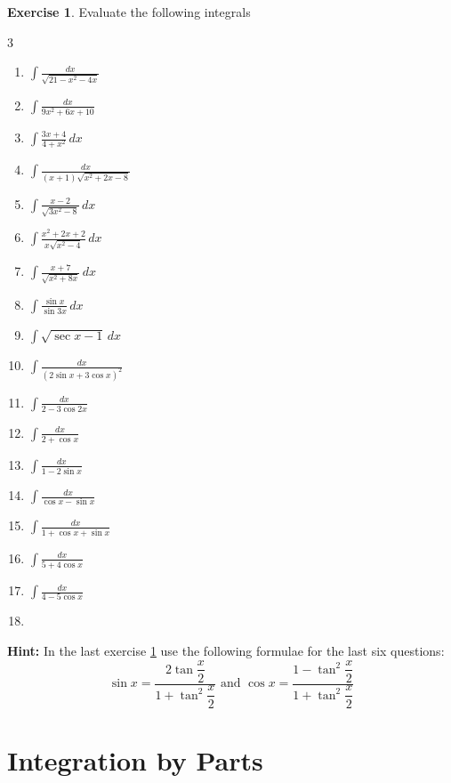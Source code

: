 \documentclass{book}
\theoremstyle{definition}
\newtheorem{exercise}{Exercise}[section]
\begin{document}
\begin{exercise}\label{ex:has_hints}
Evaluate the following integrals
\begin{multicols}{3}
\begin{enumerate}[label=(\roman*)]
    \item $\displaystyle\int \frac{dx}{\sqrt{21-x^2-4x}}$
    \item $\displaystyle\int\frac{dx}{9x^2+6x+10}$
    \item $\displaystyle\int \frac{3x+4}{4+x^2}\,dx$
    \item $\displaystyle\int \frac{dx}{(x+1)\sqrt{x^2+2x-8}}$
    \item $\displaystyle\int \frac{x-2}{\sqrt{3x^2-8}}\,dx$
    \item $\displaystyle\int \frac{x^2+2x+2}{x\sqrt{x^2-4}}\,dx$
    \item $\displaystyle\int \frac{x+7}{\sqrt{x^2+8x}}\,dx$
    \item $\displaystyle\int\frac{\sin x}{\sin 3x}\,dx$
    \item $\displaystyle\int\sqrt{\sec x-1}\,dx$
    \item $\displaystyle\int \frac{dx}{(2\sin x+3\cos x)^2}$
    \item $\displaystyle\int \frac{dx}{2-3\cos 2x}$
    \item $\displaystyle\int\frac{dx}{2+\cos x}$
    \item $\displaystyle\int\frac{dx}{1-2\sin x}$
    \item $\displaystyle\int\frac{dx}{\cos x-\sin x}$
    \item $\displaystyle\int\frac{dx}{1+\cos x+\sin x}$
    \item $\displaystyle\int\frac{dx}{5+4\cos x}$
    \item $\displaystyle\int\frac{dx}{4-5\cos x}$
    \item[] \phantom{x}    
\end{enumerate} 
\end{multicols}

\end{exercise}

\textbf{Hint:} In the last exercise \ref{ex:has_hints}  use the following formulae for the last six questions:
\[
\sin x=\frac{2\tan\dfrac{x}{2}}{1+\tan^2\dfrac{x}{2}} \text{ and } \cos x=\frac{1-\tan^2\dfrac{x}{2}}{1+\tan^2\dfrac{x}{2}}
\]



\section{Integration by Parts}
\end{document}
